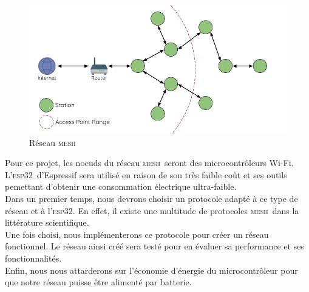 \documentclass[a4paper, 12pt]{report}
\newcommand{\esp}{\textsc{esp32}}
\newcommand{\mesh}{\textsc{mesh}}
\newcommand{\wifi}{Wi-Fi}
\begin{document}
    \begin{figure}[H]
        \centering
        \includegraphics[scale=0.4]{images/mesh-esp-mesh-network-architecture.png}
        \caption{Réseau \mesh\ \cite{esp-mesh_w}}
        \label{mesh-network-pic}
    \end{figure}

    
    Pour ce projet, les noeuds du réseau \mesh\ seront des microcontrôleurs \wifi. 
    L'\esp\ d'Espressif sera utilisé en raison de son très faible coût et
    ses outils pemettant d'obtenir une consommation électrique ultra-faible.\\

    Dans un premier temps, nous devrons choisir un protocole adapté à ce type
    de réseau et à l'\esp. En effet, il existe une multitude de protocoles
    \mesh\ dans la littérature scientifique.\\

    Une fois choisi, nous implémenterons ce protocole pour créer un
    réseau fonctionnel. Le réseau ainsi créé sera testé pour en évaluer sa performance et ses fonctionnalités.\\

    Enfin, nous nous attarderons sur l'économie d'énergie du microcontrôleur pour
    que notre réseau puisse être alimenté par batterie.



\tableofcontents
\newpage





{}

\end{document}
